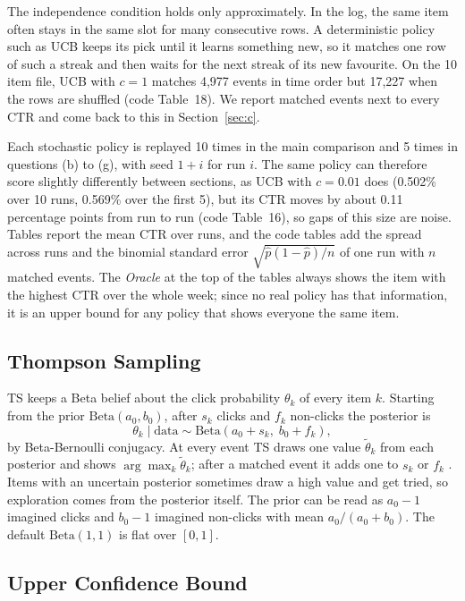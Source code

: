 \documentclass[11pt]{article}
\begin{document}
The independence condition holds only approximately. In the log, the same
item often stays in the same slot for many consecutive rows. A deterministic
policy such as UCB keeps its pick until it learns something new, so it
matches one row of such a streak and then waits for the next streak of its
new favourite. On the 10 item file, UCB with $c=1$ matches 4{,}977 events in
time order but 17{,}227 when the rows are shuffled (code Table~18). We report
matched events next to every CTR and come back to this in
Section~\ref{sec:c}.

Each stochastic policy is replayed 10 times in the main comparison and 5
times in questions (b) to (g), with seed $1+i$ for run $i$. The same policy
can therefore score slightly differently between sections, as UCB with
$c=0.01$ does (0.502\% over 10 runs, 0.569\% over the first 5), but its CTR
moves by about 0.11 percentage points from run to run (code Table~16), so
gaps of this size are noise. Tables report the mean CTR over runs, and the
code tables add the spread across runs and the binomial standard error
$\sqrt{\hat p(1-\hat p)/n}$ of one run with $n$ matched events. The
\emph{Oracle} at the top of the tables always shows the item with the highest
CTR over the whole week; since no real policy has that information, it is an
upper bound for any policy that shows everyone the same item.

\subsection{Thompson Sampling}

TS keeps a Beta belief about the click probability $\theta_k$ of every item
$k$. Starting from the prior $\text{Beta}(a_0, b_0)$, after $s_k$ clicks and
$f_k$ non-clicks the posterior is
%
\begin{equation}
  \theta_k \mid \text{data} \sim \text{Beta}(a_0 + s_k,\; b_0 + f_k),
  \label{eq:ts}
\end{equation}
%
by Beta-Bernoulli conjugacy. At every event TS draws one value
$\tilde\theta_k$ from each posterior and shows $\arg\max_k \tilde\theta_k$;
after a matched event it adds one to $s_k$ or $f_k$ \citep{russo2018}.
Items with an uncertain posterior sometimes draw a high value and get tried,
so exploration comes from the posterior itself. The prior can be read as
$a_0-1$ imagined clicks and $b_0-1$ imagined non-clicks with mean
$a_0/(a_0+b_0)$. The default $\text{Beta}(1,1)$ is flat over $[0,1]$.

\subsection{Upper Confidence Bound}
\end{document}
